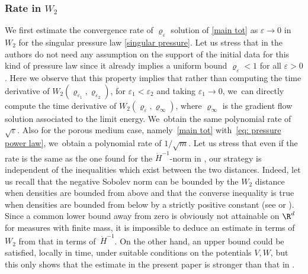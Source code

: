\subsubsection*{Rate in $W_2$}
We first estimate the convergence rate of $\varrho_\varepsilon$ solution of \eqref{main tot} as $\varepsilon\to 0$ in $W_2$ for the singular pressure law \eqref{singular pressure}. Let us stress that in \cite{DDP2021} the authors do not need any assumption on the support of the initial data for this kind of pressure law since it already implies a uniform bound $\varrho_\varepsilon <1$ for all $\varepsilon>0$. Here we observe that this property implies that rather than computing the time derivative of $W_2(\varrho_{\varepsilon_1}, \varrho_{\varepsilon_2})$, for $\varepsilon_1<\varepsilon_2$ and taking $\varepsilon_1\to 0$, we~can directly compute the time derivative of $W_2(\varrho_\varepsilon, \varrho_\infty)$, where $\varrho_\infty$ is the gradient flow solution associated to the limit energy. We~obtain the same polynomial rate of $\sqrt{\varepsilon}$.
Also for the porous medium case, namely~\eqref{main tot} with~\eqref{eq: pressure power law}, we~obtain a polynomial rate of $1/\sqrt m$.
Let us stress that even if the rate is the same as the one found for the $\dot{H}^{-1}$-norm in \cite{DDP2021}, our strategy is independent of the inequalities which exist between the two distances. Indeed, let us recall that the negative Sobolev norm can be bounded by the $W_2$ distance when densities are bounded from above and that the converse inequality is true when densities are bounded from below by a strictly positive constant (see \cite{P2018} or \cite[\S 5.5.2]{OTAM}). Since a common lower bound away from zero is obviously not attainable on $\R^d$ for measures with finite mass, it is impossible to deduce an estimate in terms of $W_2$ from that in terms of~$\dot{H}^{-1}$. On the other hand, an upper bound could be satisfied, locally in time, under suitable conditions on the potentials $V, W$, but this only shows that the estimate in the present paper is stronger than that in \cite{DDP2021}.

